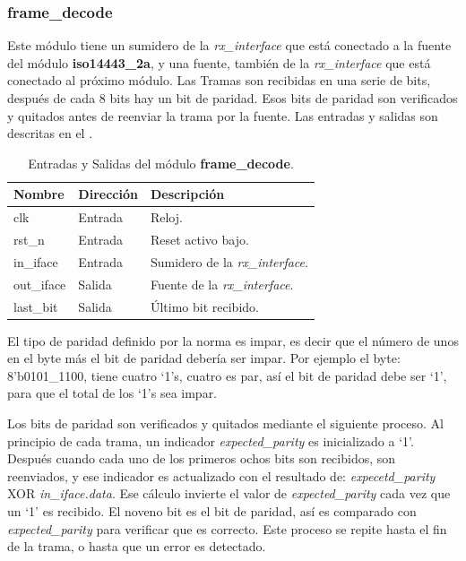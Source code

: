 \documentclass[a4paper, twoside, 11pt]{report}
\begin{document}
\FloatBarrier
\subsubsection{frame\_decode}

Este módulo tiene un sumidero de la \textit{rx\_interface} que está conectado a la fuente del módulo \textbf{iso14443\_2a}, y una fuente, también de la \textit{rx\_interface} que está conectado al próximo módulo. Las Tramas son recibidas en una serie de bits, después de cada 8 bits hay un bit de paridad. Esos bits de paridad son verificados y quitados antes de reenviar la trama por la fuente. Las entradas y salidas son descritas en el .

\begin{table}[htb]
  \centering
  \tablezebra
  \begin{tabulary}{\linewidth}{l|l|L}
    \setcounter{rownum}{0}
    \textbf{Nombre}&\textbf{Dirección}&\textbf{Descripción} \\
    \hline
    clk&Entrada&Reloj. \\
    rst\_n&Entrada&Reset activo bajo. \\
    in\_iface&Entrada&Sumidero de la \textit{rx\_interface}. \\
    out\_iface&Salida&Fuente de la \textit{rx\_interface}. \\
    last\_bit&Salida&Último bit recibido. \\
  \end{tabulary}
  \caption{Entradas y Salidas del módulo \textbf{frame\_decode}.}
  \label{tab:ports_frame_decode}
\end{table}

El tipo de paridad definido por la norma es impar, es decir que el número de unos en el byte más el bit de paridad debería ser impar. Por ejemplo el byte: 8’b0101\_1100, tiene cuatro ‘1’s, cuatro es par, así el bit de paridad debe ser ‘1’, para que el total de los ‘1’s sea impar.

Los bits de paridad son verificados y quitados mediante el siguiente proceso. Al principio de cada trama, un indicador \textit{expected\_parity} es inicializado a ‘1’. Después cuando cada uno de los primeros ochos bits son recibidos, son reenviados, y ese indicador es actualizado con el resultado de: \textit{expecetd\_parity} XOR \textit{in\_iface.data}. Ese cálculo invierte el valor de \textit{expected\_parity} cada vez que un ‘1’ es recibido. El noveno bit es el bit de paridad, así es comparado con \textit{expected\_parity} para verificar que es correcto. Este proceso se repite hasta el fin de la trama, o hasta que un error es detectado.
\end{document}
